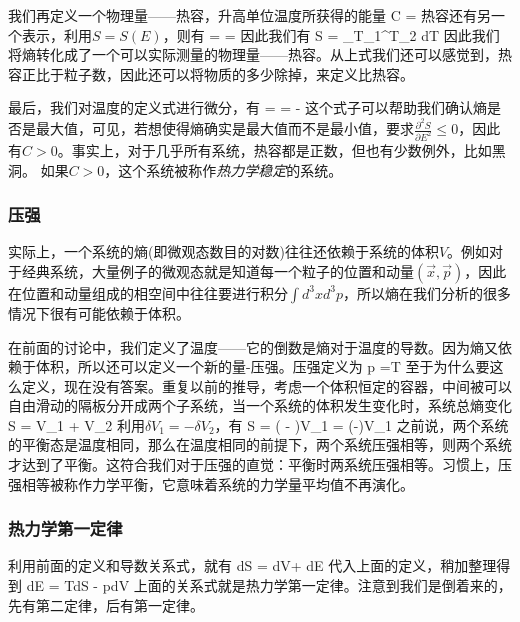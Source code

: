 \documentclass[11pt]{ctexart}
\begin{document}
我们再定义一个物理量——热容，升高单位温度所获得的能量
\beq
C =  
\eeq
热容还有另一个表示，利用$S=S(E)$，则有
\beq
{} =   =  
\eeq
因此我们有
\beq
\Delta S = \int_{T_1}^{T_2}  dT
\eeq
因此我们将熵转化成了一个可以实际测量的物理量——热容。从上式我们还可以感觉到，热容正比于粒子数，因此还可以将物质的多少除掉，来定义比热容。

最后，我们对温度的定义式进行微分，有
\beq
{} =   = -
\eeq
这个式子可以帮助我们确认熵是否是最大值，可见，若想使得熵确实是最大值而不是最小值，要求$\frac{\partial^2 S}{\partial E^2}\le 0$，因此有$C>0$。事实上，对于几乎所有系统，热容都是正数，但也有少数例外，比如黑洞。
如果$C>0$，这个系统被称作\emph{热力学稳定}的系统。
\subsubsection{压强}
实际上，一个系统的熵(即微观态数目的对数)往往还依赖于系统的体积$V$。例如对于经典系统，大量例子的微观态就是知道每一个粒子的位置和动量$(\vec{x},\vec{p})$，因此在位置和动量组成的相空间中往往要进行积分$\int d^3x d^3p$，所以熵在我们分析的很多情况下很有可能依赖于体积。

在前面的讨论中，我们定义了温度——它的倒数是熵对于温度的导数。因为熵又依赖于体积，所以还可以定义一个新的量-压强。压强定义为
\beq
p =T
\eeq
至于为什么要这么定义，现在没有答案。重复以前的推导，考虑一个体积恒定的容器，中间被可以自由滑动的隔板分开成两个子系统，当一个系统的体积发生变化时，系统总熵变化
\beq
\delta S =  \delta V_1 + \delta V_2
\eeq
利用$\delta V_1 = -\delta V_2$，有
\beq
\delta S = \left(  - \right)\delta V_1 = \left(-\right)\delta V_1
\eeq
之前说，两个系统的平衡态是温度相同，那么在温度相同的前提下，两个系统压强相等，则两个系统才达到了平衡。这符合我们对于压强的直觉：平衡时两系统压强相等。习惯上，压强相等被称作力学平衡，它意味着系统的力学量平均值不再演化。
\subsubsection{热力学第一定律}
利用前面的定义和导数关系式，就有
\beq
dS =  dV+ dE 
\eeq
代入上面的定义，稍加整理得到
\beq
dE = TdS - pdV
\eeq
上面的关系式就是热力学第一定律。注意到我们是倒着来的，先有第二定律，后有第一定律。
\end{document}
